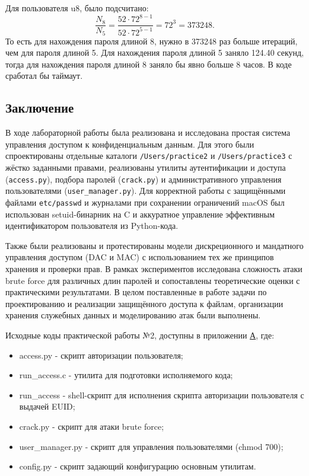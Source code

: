 \documentclass[areasetadvanced]{scrartcl}
\begin{document}
Для пользователя u8, было подсчитано:
$$
    \frac{N_8}{N_5} = \frac{52 \cdot 72^{8-1}}{52 \cdot 72^{5-1}} = 72^3 = 373248.
$$
То есть для нахождения пароля длиной 8, нужно в 373248 раз больше итераций, чем для пароля длиной 5.
Для нахождения пароля длиной 5 заняло 124.40 секунд, тогда для нахождения пароля длиной 8 заняло бы явно больше 8 часов. В коде сработал бы таймаут. 

\subsection*{Заключение}

В ходе лабораторной работы была реализована и исследована простая система управления доступом к конфиденциальным данным. Для этого были спроектированы отдельные каталоги \texttt{/Users/practice2} и \texttt{/Users/practice3} с жёстко заданными правами, реализованы утилиты аутентификации и доступа (\texttt{access.py}), подбора паролей (\texttt{crack.py}) и административного управления пользователями (\texttt{user\_manager.py}). Для корректной работы с защищёнными файлами \texttt{etc/passwd} и журналами при сохранении ограничений macOS был использован setuid-бинарник на C и аккуратное управление эффективным идентификатором пользователя из Python-кода.

Также были реализованы и протестированы модели дискреционного и мандатного управления доступом (DAC и MAC) с использованием тех же принципов хранения и проверки прав. В рамках экспериментов исследована сложность атаки brute force для различных длин паролей и сопоставлены теоретические оценки с практическими результатами. В целом поставленные в работе задачи по проектированию и реализации защищённого доступа к файлам, организации хранения служебных данных и моделированию атак были выполнены.

Исходные коды практической работы №2, доступны в приложении \hyperref[sec:pril2]{А}, где:
\begin{itemize}
    \item access.py - скрипт авторизации пользователя;
    \item run\_access.c - утилита для подготовки исполняемого кода;
    \item run\_access - shell-скрипт для исполнения скрипта авторизации пользователя с выдачей EUID;
    \item crack.py - скрипт для атаки brute force;
    \item user\_manager.py - скрипт для управления пользователями (chmod 700); 
    \item config.py - скрипт задающий конфигурацию основным утилитам. 
\end{itemize}
\end{document}
